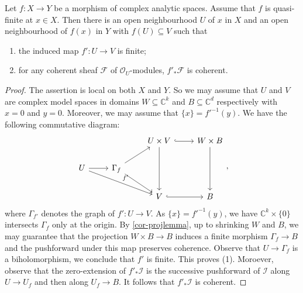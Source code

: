 \begin{proposition}\label{prop-quasifinitefinite}
    Let $f:X\rightarrow Y$ be a morphism of complex analytic spaces. Assume that $f$ is quasi-finite at $x\in X$. Then there is an open neighbourhood $U$ of $x$ in $X$ and an open neighbourhood of $f(x)$ in $Y$ with $f(U)\subseteq V$ such that 
    \begin{enumerate}
        \item the induced map $f':U\rightarrow V$ is finite;
        \item for any coherent sheaf $\mathcal{F}$ of $\mathcal{O}_U$-modules, $f'_*\mathcal{F}$ is coherent. 
    \end{enumerate}
\end{proposition}
\begin{proof}
    The assertion is local on both $X$ and $Y$. So we may assume that $U$ and $V$ are complex model spaces in domains $W\subseteq \mathbb{C}^k$ and $B\subseteq \mathbb{C}^d$ respectively with $x=0$ and $y=0$. Moreover, we may assume that $\{x\}=f'^{-1}(y)$. We have the following commutative diagram:
    \[
        \begin{tikzcd}
            &                                & U\times V \arrow[dd] \arrow[r, hook] & W\times B \arrow[dd] \\
U \arrow[r] \arrow[rrd,"f'"] & \Gamma_f \arrow[rd] \arrow[ru] &                                      &                      \\
            &                                & V \arrow[r, hook]                    & B                   
\end{tikzcd},
    \]
    where $\Gamma_{f'}$ denotes the graph of $f':U\rightarrow V$. As $\{x\}=f'^{-1}(y)$, we have $\mathbb{C}^k\times\{0\}$ intersects $\Gamma_f$ only at the origin. By \cref{cor-projlemma}, up to shrinking $W$ and $B$, we may guarantee that the projection $W\times B\rightarrow B$ induces a finite morphism $\Gamma_f\rightarrow B$ and the pushforward under this map preserves coherence. Observe that $U\rightarrow \Gamma_f$ is a biholomorphism, we conclude that $f'$ is finite. This proves (1). Moroever, observe that the zero-extension of $f'_*\mathcal{I}$ is the successive pushforward of $\mathcal{I}$ along $U\rightarrow U_f$ and then along $U_f\rightarrow B$. It follows that  $f'_*\mathcal{I}$ is coherent.
\end{proof}


